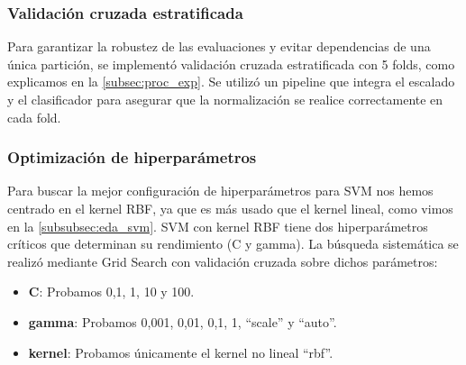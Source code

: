 \subsubsection*{Validación cruzada estratificada}

Para garantizar la robustez de las evaluaciones y evitar dependencias de una única partición, se implementó validación cruzada estratificada con 5 folds, como explicamos en la \autoref{subsec:proc_exp}. Se utilizó un pipeline que integra el escalado y el clasificador para asegurar que la normalización se realice correctamente en cada fold. 

\subsubsection*{Optimización de hiperparámetros}

Para buscar la mejor configuración de hiperparámetros para SVM nos hemos centrado en el kernel RBF, ya que es más usado que el kernel lineal, como vimos en la \autoref{subsubsec:eda_svm}. SVM con kernel RBF tiene dos hiperparámetros críticos que determinan su rendimiento (C y gamma). La búsqueda sistemática se realizó mediante Grid Search con validación cruzada sobre dichos parámetros:

\begin{itemize}
	\item \textbf{C}: Probamos 0,1, 1, 10 y 100.
	\item \textbf{gamma}: Probamos 0,001, 0,01, 0,1, 1, ``scale'' y ``auto''.
	\item \textbf{kernel}: Probamos únicamente el kernel no lineal ``rbf''.
\end{itemize}